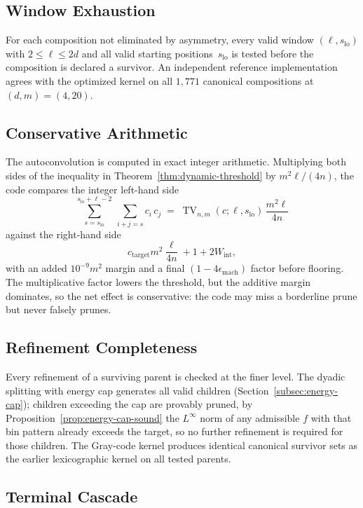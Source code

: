 \documentclass[11pt, letterpaper]{article}
\theoremstyle{paperplain}
\theoremstyle{paperdef}
\begin{document}
\subsection{Window Exhaustion}

For each composition not eliminated by asymmetry, every valid
window $(\ell, s_{\mathrm{lo}})$ with $2 \le \ell \le 2d$ and all
valid starting positions~$s_{\mathrm{lo}}$ is tested before the
composition is declared a survivor.
An independent reference implementation agrees with the
optimized kernel on all $1{,}771$ canonical compositions at $(d,m)=(4,20)$.

\subsection{Conservative Arithmetic}

The autoconvolution is computed in exact integer arithmetic.
Multiplying both sides of the inequality in
Theorem~\ref{thm:dynamic-threshold} by $m^2\ell/(4n)$, the code
compares the integer left-hand side
\[
  \sum_{s=s_{\mathrm{lo}}}^{s_{\mathrm{lo}}+\ell-2}\
  \sum_{i+j=s} c_i\, c_j
  \;=\;
  \operatorname{TV}_{n,m}(c;\ell,s_{\mathrm{lo}})\,\frac{m^2\ell}{4n}
\]
against the right-hand side
\[
  c_{\mathrm{target}}m^2\frac{\ell}{4n} + 1 + 2W_{\mathrm{int}},
\]
with an added $10^{-9}m^2$ margin and a final
$(1 - 4\epsilon_{\mathrm{mach}})$ factor before flooring.  The
multiplicative factor lowers the threshold, but the additive margin
dominates, so the net effect is conservative: the code may miss a
borderline prune but never falsely prunes.

\subsection{Refinement Completeness}

Every refinement of a surviving parent is checked at the finer level.
The dyadic splitting with energy cap generates all valid children
(Section~\ref{subsec:energy-cap}); children exceeding the cap are
provably pruned, by
Proposition~\ref{prop:energy-cap-sound} the $L^\infty$ norm of any
admissible $f$ with that bin pattern already exceeds the target, so
no further refinement is required for those children.  The Gray-code
kernel produces identical canonical survivor sets as the earlier
lexicographic kernel on all tested parents.

\subsection{Terminal Cascade}
\end{document}
